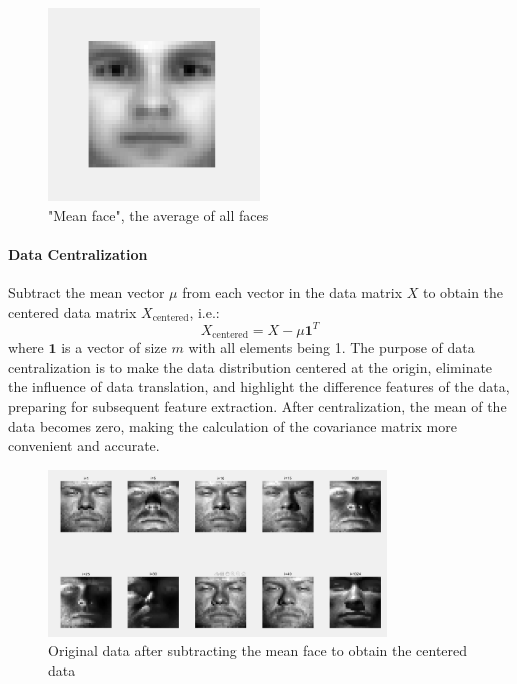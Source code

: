 \documentclass{article}
\begin{document}
\begin{figure}[H]
    \centering
    \includegraphics[width=0.5\textwidth]{Img/v2-918060b552a96c398d46f84574d5f2e4_1440w.png}
    \caption{"Mean face", the average of all faces}
\end{figure}

\paragraph{Data Centralization}
Subtract the mean vector \( \mu \) from each vector in the data matrix \( X \) to obtain the centered data matrix \( X_{\text{centered}} \), i.e.:
\[
X_{\text{centered}} = X - \mu \mathbf{1}^T
\]
where \( \mathbf{1} \) is a vector of size \( m \) with all elements being 1. The purpose of data centralization is to make the data distribution centered at the origin, eliminate the influence of data translation, and highlight the difference features of the data, preparing for subsequent feature extraction. After centralization, the mean of the data becomes zero, making the calculation of the covariance matrix more convenient and accurate.

\begin{figure}[H]
    \centering
    \includegraphics[width=0.8\textwidth]{Img/v2-65a459d10dbf796dcd4dbfec736c810a_1440w.png}
    \caption{Original data after subtracting the mean face to obtain the centered data}
\end{figure}
\end{document}
